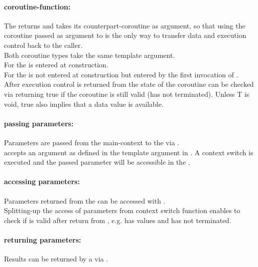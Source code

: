 \paragraph*{coroutine-function:}
The \corofunction returns  and takes its counterpart-coroutine as
argument, so that using the coroutine passed as argument to \corofunction is the
only way to transfer data and execution control back to the caller.\\
Both coroutine types take the same template argument.\\
For \pullcoro the \corofunction is entered at \pullcoro construction.\\
For \pushcoro the \corofunction is not entered at \pushcoro construction but
entered by the first invocation of \pushcoroop.\\
After execution control is returned from \corofunction the state of the
coroutine can be checked via \pullcorobool returning true if the coroutine is
still valid (\corofunction has not terminated). Unless T is void, true also
implies that a data value is available.

\paragraph*{passing parameters:}
Parameters are passed from the main-context to the \corofunction via
\pushcoroop.\\
\newline
\pushcoroop accepts an argument as defined in the template argument in
\pushcoro.
A context switch is executed and the passed parameter will be accessible in
the \corofunction.

\paragraph*{accessing parameters:}
Parameters returned from the \corofunction can be accessed with
\pullcoroget.\\
\newline
Splitting-up the access of parameters from context switch function enables to
check if \pullcoro is valid after return from \pullcoroop, e.g. \pullcoro has
values and \corofunction has not terminated.

\paragraph*{returning parameters:}
Results can be returned by a \corofunction via \pushcoroop.\\

